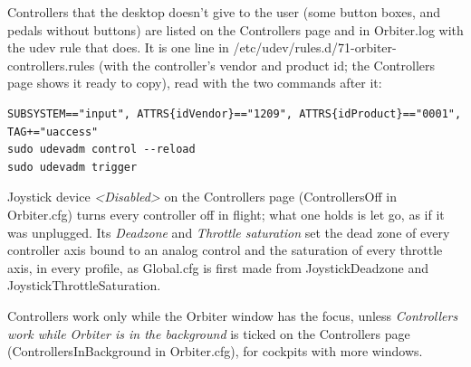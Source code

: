 \documentclass[Orbiter User Manual.tex]{subfiles}
\begin{document}
Controllers that the desktop doesn't give to the user (some button boxes, and pedals without buttons) are listed on the Controllers page and in Orbiter.log with the udev rule that does. It is one line in /etc/udev/rules.d/71-orbiter-controllers.rules (with the controller's vendor and product id; the Controllers page shows it ready to copy), read with the two commands after it:
\begin{lstlisting}[language=OSFS,breaklines=true]
SUBSYSTEM=="input", ATTRS{idVendor}=="1209", ATTRS{idProduct}=="0001", TAG+="uaccess"
sudo udevadm control --reload
sudo udevadm trigger
\end{lstlisting}
Joystick device \textit{\textless{}Disabled\textgreater{}} on the Controllers page (ControllersOff in Orbiter.cfg) turns every controller off in flight; what one holds is let go, as if it was unplugged. Its \textit{Deadzone} and \textit{Throttle saturation} set the dead zone of every controller axis bound to an analog control and the saturation of every throttle axis, in every profile, as Global.cfg is first made from JoystickDeadzone and JoystickThrottleSaturation.

Controllers work only while the Orbiter window has the focus, unless \textit{Controllers work while Orbiter is in the background} is ticked on the Controllers page (ControllersInBackground in Orbiter.cfg), for cockpits with more windows.
\end{document}
